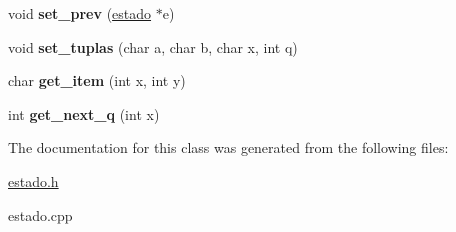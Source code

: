 \begin{DoxyCompactItemize}
\item 
\hypertarget{classestado_a5b2a9cfb3f8dfd4e036d8713d9a339d4}{}\label{classestado_a5b2a9cfb3f8dfd4e036d8713d9a339d4} 
void {\bfseries set\+\_\+prev} (\hyperlink{classestado}{estado} $\ast$e)
\item 
\hypertarget{classestado_aabe45b02ce7932322436346e5ad51ec7}{}\label{classestado_aabe45b02ce7932322436346e5ad51ec7} 
void {\bfseries set\+\_\+tuplas} (char a, char b, char x, int q)
\item 
\hypertarget{classestado_af50a92081b466b7c4ce8714c529c8c67}{}\label{classestado_af50a92081b466b7c4ce8714c529c8c67} 
char {\bfseries get\+\_\+item} (int x, int y)
\item 
\hypertarget{classestado_a60b352a81fec0d49b9b918594fddbde2}{}\label{classestado_a60b352a81fec0d49b9b918594fddbde2} 
int {\bfseries get\+\_\+next\+\_\+q} (int x)
\end{DoxyCompactItemize}


The documentation for this class was generated from the following files\+:\begin{DoxyCompactItemize}
\item 
\hyperlink{estado_8h}{estado.\+h}\item 
estado.\+cpp\end{DoxyCompactItemize}
